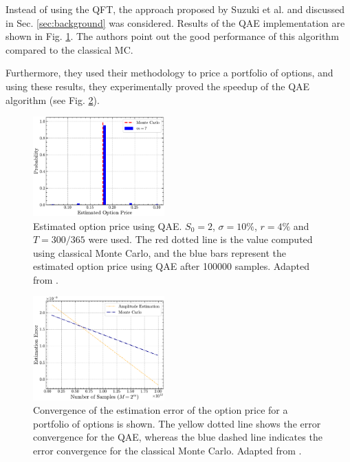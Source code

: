 \documentclass[prx,twocolumn,floatfix,superscriptaddress,longbibliography]{revtex4-1}
\begin{document}
Instead of using the QFT, the approach proposed by Suzuki et al. \cite{Suzuki2020} and discussed in Sec. \ref{sec:background} was considered.
Results of the QAE implementation are shown in Fig. \ref{fig:results-qae}. The authors point out the good performance of this algorithm compared to the classical MC.

Furthermore, they used their methodology to price a portfolio of options, and using these results, they experimentally proved the speedup of the QAE algorithm (see Fig. \ref{fig:portfolio-option}).

\begin{figure}[h!]
\centering
\includegraphics[width=0.45\textwidth]{option-price-estimation.pdf}
  \caption{\label{fig:results-qae} Estimated option price using QAE. $S_0 = 2$, $ \sigma = 10\%$, $r = 4\%$ and $T=300/365$ were used. The red dotted line is the value computed using classical Monte Carlo, and the blue bars represent the estimated option price using QAE after 100000 samples. Adapted  from \cite{Stamatopoulos2020}.}
\end{figure}

\begin{figure}[h!]
\centering
\includegraphics[width=0.45\textwidth]{estimation-error.pdf}
  \caption{\label{fig:portfolio-option} 
Convergence of the estimation error of the option price for a portfolio of options is shown. The yellow dotted line shows the error convergence for the QAE, whereas the blue dashed line indicates the error convergence for the classical Monte Carlo. Adapted  from \cite{Stamatopoulos2020}.}
\end{figure}
\end{document}
